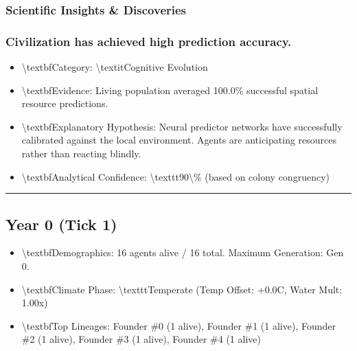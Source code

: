 \documentclass[11pt,a4paper]{article}
\begin{document}
\subsubsection*{ Scientific Insights \& Discoveries}
\subsubsection*{ Civilization has achieved high prediction accuracy.}
\begin{itemize}
  \item \textbackslash{}textbf{Category:} \textbackslash{}textit{Cognitive Evolution}
  \item \textbackslash{}textbf{Evidence:} Living population averaged 100.0\% successful spatial resource predictions.
  \item \textbackslash{}textbf{Explanatory Hypothesis:} Neural predictor networks have successfully calibrated against the local environment. Agents are anticipating resources rather than reacting blindly.
  \item \textbackslash{}textbf{Analytical Confidence:} \textbackslash{}texttt{90\textbackslash{}\%} (based on colony congruency)
\end{itemize}

\noindent\rule{\textwidth}{0.4pt}

\subsection*{ Year 0 (Tick 1)}
\begin{itemize}
  \item \textbackslash{}textbf{Demographics:} 16 agents alive / 16 total. Maximum Generation: Gen 0.
  \item \textbackslash{}textbf{Climate Phase:} \textbackslash{}texttt{Temperate} (Temp Offset: +0.0C, Water Mult: 1.00x)
  \item \textbackslash{}textbf{Top Lineages:} Founder \#0 (1 alive), Founder \#1 (1 alive), Founder \#2 (1 alive), Founder \#3 (1 alive), Founder \#4 (1 alive)
\end{itemize}
\end{document}
